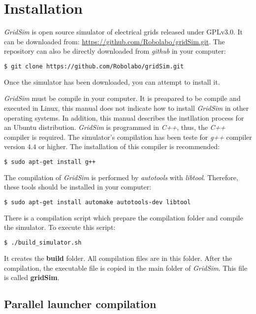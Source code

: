 \chapter{Installation}
\label{chap:installation}


{\it GridSim} is open source simulator of electrical grids released under GPLv3.0.
It can be downloaded from: \href{https://github.com/Robolabo/gridSim.git}{https://github.com/Robolabo/gridSim.git}.
The repository can also be directly downloaded from {\it github} in your computer:
\begin{lstlisting}[language=bash]
  $ git clone https://github.com/Robolabo/gridSim.git
\end{lstlisting}
\noindent
Once the simulator has been downloaded, you can attempt to install it.

{\it GridSim} must be compile in your computer.
It is preapared to be compile and executed in Linux, this manual does not indicate how to install {\it GridSim} in other operating systems.
In addition, this manual describes the instllation process for an Ubuntu distribution.
{\it GridSim} is programmed in {\it C++}, thus, the {\it C++} compiler is required.
The simulator's compilation has been teste for {\it g++} compiler version $4.4$ or higher.
The installation of this compiler is recommended:
\begin{lstlisting}[language=bash]
  $ sudo apt-get install g++
\end{lstlisting}

The compilation of {\it GridSim} is performed by {\it autotools} with {\it libtool}.
Therefore, these tools should be installed in your computer:
\begin{lstlisting}[language=bash]
  $ sudo apt-get install automake autotools-dev libtool
\end{lstlisting}

There is a compilation script which prepare the compilation folder and compile the simulator.
To execute this script:
\begin{lstlisting}[language=bash]
  $ ./build_simulator.sh
\end{lstlisting}
\noindent
It creates the {\bf build} folder.
All compilation files are in this folder.
After the compilation, the executable file is copied in the main folder of {\it GridSim}.
This file is called {\bf gridSim}.

%
\section{Parallel launcher compilation}

